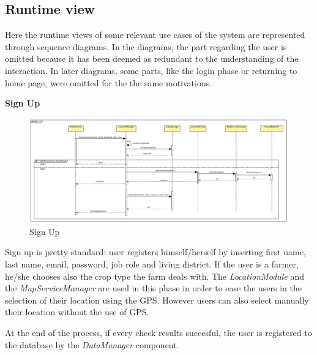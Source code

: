 \documentclass[table, 12pt]{article}
\begin{document}
\subsection{Runtime view}

Here the runtime views of some relevant use cases of the system are represented through sequence diagrams. 
In the diagrams, the part regarding the user is omitted because it has been deemed as redundant to the understanding of the interaction.
In later diagrams, some parts, like the login phase or returning to home page, were omitted for the the same motivations.

\newpage
\textbf{Sign Up}
\begin{center}
    \begin{figure}[H]
        \includegraphics[scale=0.4, center]{assets/SequenceDiagram/SignUp.png}
        \caption{Sign Up}
        \label{fig:signup}
    \end{figure}
\end{center}
Sign up is pretty standard: user registers himself/herself by inserting first name, last name, email, password, job role and living district. If the user is a farmer, he/she chooses also the crop type the farm deals with.
The \textit{LocationModule} and the \textit{MapServiceManager} are used in this phase in order to ease the users in the selection of their location using the GPS. 
However users can also select manually their location without the use of GPS.

At the end of the process, if every check results succesful, the user is registered to the database by the \textit{DataManager} component.
\end{document}
